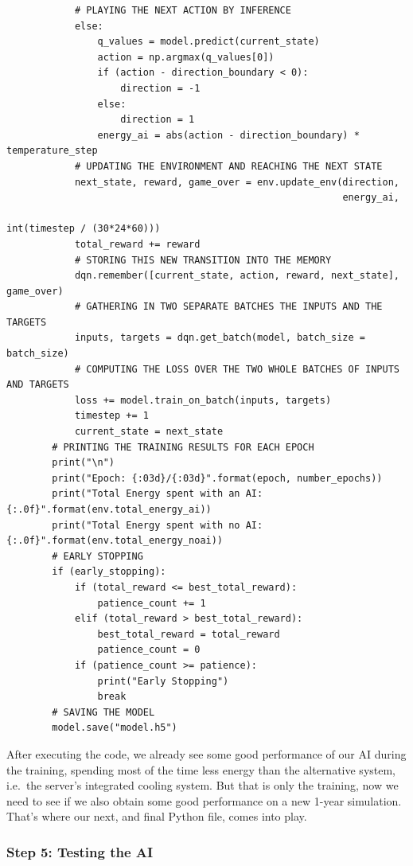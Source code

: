 \documentclass[]{book}
\begin{document}
\begin{lstlisting}
            # PLAYING THE NEXT ACTION BY INFERENCE
            else:
                q_values = model.predict(current_state)
                action = np.argmax(q_values[0])
                if (action - direction_boundary < 0):
                    direction = -1
                else:
                    direction = 1
                energy_ai = abs(action - direction_boundary) * temperature_step
            # UPDATING THE ENVIRONMENT AND REACHING THE NEXT STATE
            next_state, reward, game_over = env.update_env(direction,
                                                           energy_ai,
                                                           int(timestep / (30*24*60)))
            total_reward += reward
            # STORING THIS NEW TRANSITION INTO THE MEMORY
            dqn.remember([current_state, action, reward, next_state], game_over)
            # GATHERING IN TWO SEPARATE BATCHES THE INPUTS AND THE TARGETS
            inputs, targets = dqn.get_batch(model, batch_size = batch_size)
            # COMPUTING THE LOSS OVER THE TWO WHOLE BATCHES OF INPUTS AND TARGETS
            loss += model.train_on_batch(inputs, targets)
            timestep += 1
            current_state = next_state
        # PRINTING THE TRAINING RESULTS FOR EACH EPOCH
        print("\n")
        print("Epoch: {:03d}/{:03d}".format(epoch, number_epochs))
        print("Total Energy spent with an AI: {:.0f}".format(env.total_energy_ai))
        print("Total Energy spent with no AI: {:.0f}".format(env.total_energy_noai))
        # EARLY STOPPING
        if (early_stopping):
            if (total_reward <= best_total_reward):
                patience_count += 1
            elif (total_reward > best_total_reward):
                best_total_reward = total_reward
                patience_count = 0
            if (patience_count >= patience):
                print("Early Stopping")
                break
        # SAVING THE MODEL
        model.save("model.h5")
\end{lstlisting}

After executing the code, we already see some good performance of our AI during the training, spending most of the time less energy than the alternative system, i.e.~the server's integrated cooling system. But that is only the training, now we need to see if we also obtain some good performance on a new 1-year simulation. That's where our next, and final Python file, comes into play.

\newpage

\subsubsection{Step 5: Testing the AI}
\end{document}
